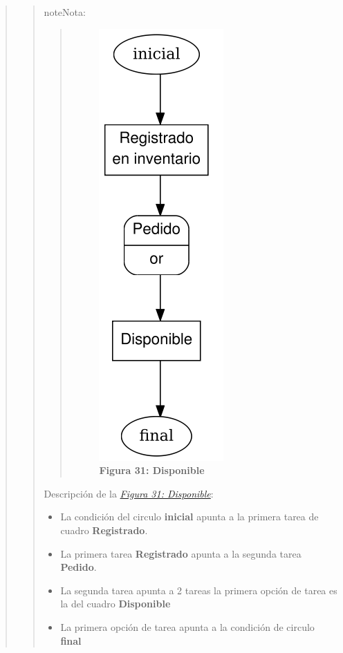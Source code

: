 \documentclass[letterpaper,11pt,spanish]{sphinxmanual}
\begin{document}
\begin{quote}
\begin{quote}
\begin{notice}{note}{Nota:}
\begin{quote}
\begin{figure}[htbp]
\includegraphics{grafo_inflow3.png}
\caption{\textbf{Figura 31: Disponible}}\label{_templates/Contenido6/Parte4:figura31}\end{figure}
\end{quote}

Descripción de la {\hyperref[_templates/Contenido6/Parte4:figura31]{\emph{Figura 31: Disponible}}}:
\begin{itemize}
\item {} 
La condición del circulo \textbf{inicial} apunta a la primera tarea de cuadro \textbf{Registrado}.

\item {} 
La primera tarea \textbf{Registrado} apunta a la segunda tarea \textbf{Pedido}.

\item {} 
La segunda tarea apunta a 2 tareas la primera opción de tarea es la del cuadro \textbf{Disponible}

\item {} 
La primera opción de tarea apunta a la condición de circulo \textbf{final}


\end{itemize}
\end{notice}
\end{quote}
\end{quote}
\end{document}

